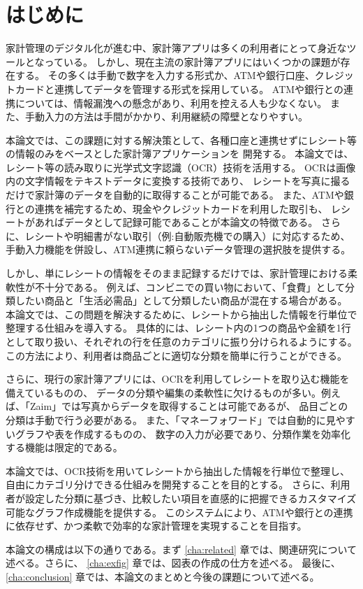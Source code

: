 \documentclass[main]{subfiles}
\begin{document}
\chapter{はじめに}
\label{cha:intro}

家計管理のデジタル化が進む中、家計簿アプリは多くの利用者にとって身近なツールとなっている。
しかし、現在主流の家計簿アプリにはいくつかの課題が存在する。
その多くは手動で数字を入力する形式か、ATMや銀行口座、クレジットカードと連携してデータを管理する形式を採用している。
ATMや銀行との連携については、情報漏洩への懸念があり、利用を控える人も少なくない。
また、手動入力の方法は手間がかかり、利用継続の障壁となりやすい。

本論文では、この課題に対する解決策として、各種口座と連携せずにレシート等の情報のみをベースとした家計簿アプリケーションを
開発する。
本論文では、レシート等の読み取りに光学式文字認識（OCR）技術を活用する。
OCRは画像内の文字情報をテキストデータに変換する技術であり、
レシートを写真に撮るだけで家計簿のデータを自動的に取得することが可能である。
また、ATMや銀行との連携を補完するため、現金やクレジットカードを利用した取引も、
レシートがあればデータとして記録可能であることが本論文の特徴である。
さらに、レシートや明細書がない取引（例:自動販売機での購入）に対応するため、
手動入力機能を併設し、ATM連携に頼らないデータ管理の選択肢を提供する。

しかし、単にレシートの情報をそのまま記録するだけでは、家計管理における柔軟性が不十分である。
例えば、コンビニでの買い物において、「食費」として分類したい商品と「生活必需品」として分類したい商品が混在する場合がある。
本論文では、この問題を解決するために、レシートから抽出した情報を行単位で整理する仕組みを導入する。
具体的には、レシート内の1つの商品や金額を1行として取り扱い、それぞれの行を任意のカテゴリに振り分けられるようにする。
この方法により、利用者は商品ごとに適切な分類を簡単に行うことができる。

さらに、現行の家計簿アプリには、OCRを利用してレシートを取り込む機能を備えているものの、
データの分類や編集の柔軟性に欠けるものが多い。例えば、「Zaim」では写真からデータを取得することは可能であるが、
品目ごとの分類は手動で行う必要がある。%
また、「マネーフォワード」では自動的に見やすいグラフや表を作成するものの、
数字の入力が必要であり、分類作業を効率化する機能は限定的である。

本論文では、OCR技術を用いてレシートから抽出した情報を行単位で整理し、自由にカテゴリ分けできる仕組みを開発することを目的とする。
さらに、利用者が設定した分類に基づき、比較したい項目を直感的に把握できるカスタマイズ可能なグラフ作成機能を提供する。
このシステムにより、ATMや銀行との連携に依存せず、かつ柔軟で効率的な家計管理を実現することを目指す。

本論文の構成は以下の通りである。まず \ref{cha:related} 章では、関連研究について述べる。さらに、
\ref{cha:exfig} 章では、図表の作成の仕方を述べる。
最後に、\ref{cha:conclusion} 章では、本論文のまとめと今後の課題について述べる。
\end{document}
